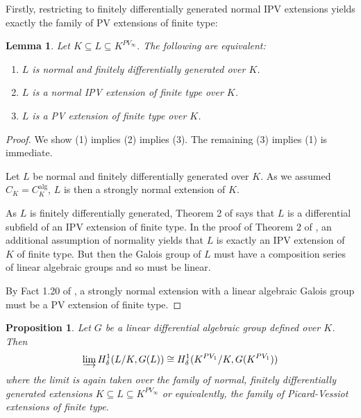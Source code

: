 \documentclass{amsart}
\newtheorem{proposition}[theorem]{Proposition}
\newtheorem{lemma}[theorem]{Lemma}
\theoremstyle{definition}
\theoremstyle{remark}
\numberwithin{equation}{section}
\def \alg {\operatorname{alg}}
\begin{document}
Firstly, restricting to finitely differentially generated normal IPV extensions yields exactly the family of PV extensions of finite type: 

\begin{lemma}\label{lem: normal IPV is PV}
    Let $K\subseteq L\subseteq K^{PV_\infty}$. The following are equivalent: 
    \begin{enumerate}
        \item $L$ is normal and finitely differentially generated over $K$.
        \item $L$ is a normal IPV extension of finite type over $K$.
        \item $L$ is a PV extension of finite type over $K$.
    \end{enumerate} 
\end{lemma}

\begin{proof}
    We show (1) implies (2) implies (3). The remaining (3) implies (1) is immediate.
    
    Let $L$ be normal and finitely differentially generated over $K$. As we assumed $C_K=C_K^{\alg}$, $L$ is then a strongly normal extension of $K$. 

    As $L$ is finitely differentially generated, Theorem 2 of \cite{magid2022completepicardvessiotclosure} says that $L$ is a differential subfield of an IPV extension of finite type. In the proof of Theorem 2 of \cite{magid2022completepicardvessiotclosure}, an additional assumption of normality yields that $L$ is exactly an IPV extension of $K$ of finite type.
    But then the Galois group of $L$ must have a composition series of linear algebraic groups and so must be linear. 
    
    By Fact 1.20 of \cite{AnandDavidComm}, a strongly normal extension with a linear algebraic Galois group must be a PV extension of finite type. 
    
    
\end{proof}

\begin{proposition}
    Let $G$ be a linear differential algebraic group defined over $K$. Then $$\varinjlim H^1_{\delta}(L/K,G(L)) \cong H^1_{\delta}(K^{PV_1}/K,G(K^{PV_1}))$$ where the limit is again taken over the family of normal, finitely differentially generated extensions $K \subseteq L\subseteq K^{PV_\infty}$ or equivalently, the family of Picard-Vessiot extensions of finite type. 
\end{proposition}
\end{document}

